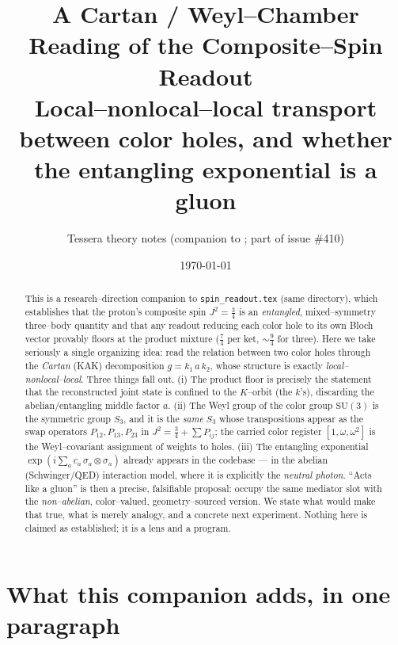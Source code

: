 \documentclass[11pt,oneside]{article}
\title{\bfseries A Cartan / Weyl--Chamber Reading of the Composite--Spin Readout\\[4pt]
\large Local--nonlocal--local transport between color holes, and whether the
entangling exponential is a gluon}
\author{Tessera theory notes \quad(companion to \code{spin\_readout.tex}; part of issue \#410)}
\date{\today}
\newcommand{\code}[1]{\texttt{#1}}
\newcommand{\SU}{\mathrm{SU}}
\theoremstyle{plain}
\begin{document}
\maketitle

\begin{abstract}
\noindent
This is a research--direction companion to \code{spin\_readout.tex} (same
directory), which establishes that the proton's composite spin $J^2=\tfrac34$ is
an \emph{entangled}, mixed--symmetry three--body quantity and that any readout
reducing each color hole to its own Bloch vector provably floors at the product
mixture ($\tfrac74$ per ket, ${\sim}\tfrac94$ for three). Here we take seriously a
single organizing idea: read the relation between two color holes through the
\emph{Cartan} (KAK) decomposition $g = k_1\,a\,k_2$, whose structure is exactly
\emph{local--nonlocal--local}. Three things fall out. (i) The product floor is
precisely the statement that the reconstructed joint state is confined to the
$K$--orbit (the $k$'s), discarding the abelian/entangling middle factor $a$. (ii)
The Weyl group of the color group $\SU(3)$ is the symmetric group $S_3$, and it is
the \emph{same} $S_3$ whose transpositions appear as the swap operators
$P_{12},P_{13},P_{23}$ in $J^2=\tfrac34+\sum P_{ij}$; the carried color register
$[1,\omega,\omega^2]$ is the Weyl--covariant assignment of weights to holes. (iii)
The entangling exponential $\exp(i\sum_a c_a\,\sigma_a\!\otimes\!\sigma_a)$ already
appears in the codebase --- in the abelian (Schwinger/QED) interaction model,
where it is explicitly the \emph{neutral photon}. ``Acts like a gluon'' is then a
precise, falsifiable proposal: occupy the same mediator slot with the
\emph{non--abelian}, color--valued, geometry--sourced version. We state what would
make that true, what is merely analogy, and a concrete next experiment. Nothing
here is claimed as established; it is a lens and a program.
\end{abstract}

\tableofcontents
\bigskip

\section{What this companion adds, in one paragraph}
\label{sec:premise}
\end{document}
